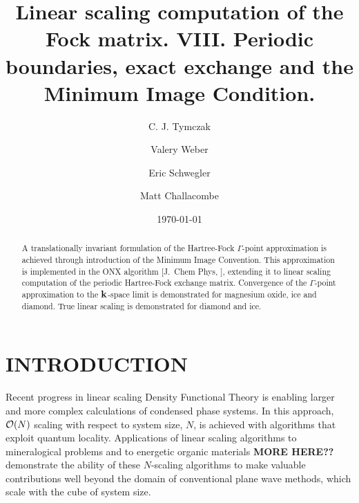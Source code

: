\documentclass[prb,aps,nobibnotes,twocolumn,doublespace,twocolumngrid,superbib]{revtex4}
\begin{document}
\title{Linear scaling computation of the Fock matrix. VIII. Periodic \\
     boundaries, exact exchange and the Minimum Image Condition. }

\author{C. J. Tymczak}
\author{Valery Weber}
\author{Eric Schwegler}
\author{Matt Challacombe}




\date{\today}
\begin{abstract}
A translationally invariant formulation of the Hartree-Fock $\Gamma$-point approximation
is achieved through introduction of the Minimum Image Convention.  This approximation is implemented 
in the ONX algorithm [J.~Chem Phys, ], extending it to linear scaling computation of the periodic 
Hartree-Fock 
exchange matrix.  Convergence of the $\Gamma$-point approximation to the ${\bf k}$-space limit is 
demonstrated for 
magnesium oxide, ice and diamond.  True linear scaling is demonstrated for diamond and ice. 
\end{abstract}

\pacs{}

\maketitle


\section{INTRODUCTION}

Recent progress in linear scaling Density Functional Theory is enabling larger and 
more complex calculations of condensed phase systems.  In this approach, ${\cal O}(N)$
scaling with respect to system size, $N$, is achieved with algorithms that exploit 
quantum locality.  Applications of linear scaling algorithms to mineralogical problems 
\cite{MCraig04} and to energetic organic materials \cite{} {\bf MORE HERE??} demonstrate the ability 
of these $N$-scaling algorithms to make valuable contributions well beyond the domain of 
conventional plane wave methods, which scale with the cube of system size.  
\end{document}

